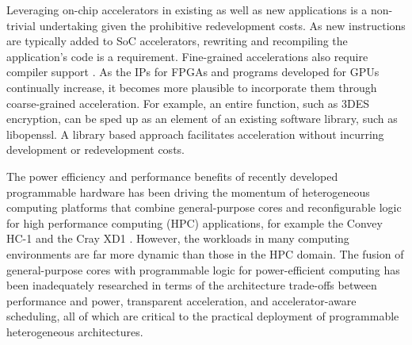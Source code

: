 Leveraging on-chip accelerators in existing as well as new applications is a
non-trivial undertaking given the prohibitive redevelopment costs.  
As new instructions are typically added to SoC
accelerators, rewriting and recompiling the application's code is
a requirement. Fine-grained accelerations also require compiler support \cite{Govindaraju:2012fn}. As the IPs for
FPGAs and programs developed for GPUs continually increase, it becomes more plausible
to incorporate them through coarse-grained acceleration. For example, an entire function, such as 3DES encryption,
can be sped up as an element of an existing software library, such as libopenssl. A library based
approach facilitates acceleration without incurring development or redevelopment costs. 

The power efficiency \cite{hamada09,thomas09} and performance benefits
of recently developed programmable hardware has been driving the momentum of
heterogeneous computing platforms that combine general-purpose cores
and reconfigurable logic for high performance computing (HPC) applications, 
for example the Convey HC-1 \cite{brewer09} and the Cray XD1 \cite{Ulmer:2005vh}.
However, the workloads in many computing environments
are far more dynamic than those in the HPC domain. The
fusion of general-purpose cores with programmable logic for
power-efficient computing has been inadequately researched in terms of
the architecture trade-offs between performance and power, transparent
acceleration, and accelerator-aware scheduling, all of which are
critical to the practical deployment of programmable heterogeneous
architectures.

